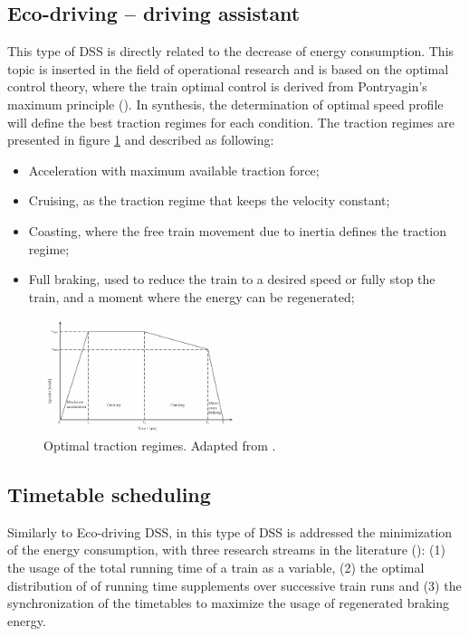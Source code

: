 \subsection{Eco-driving – driving assistant}
\label{subs:352}

	This type of \ac{DSS} is directly related to the decrease of energy consumption. This topic is inserted in the field of operational research and is based on the optimal control theory, where the train optimal control is derived from Pontryagin's maximum principle (\cite{pontryagin1963}).  
	In synthesis, the determination of optimal speed profile will define the best traction regimes for each condition. The traction regimes are presented in figure \ref{fig:scheepmaker2017a} and described as following:
	
	\begin{itemize}
		\setlength\itemsep{-0.5em}
		\item Acceleration with maximum available traction force;
		\item Cruising, as the traction regime that keeps the velocity constant;
		\item Coasting, where the free train movement due to inertia defines the traction regime;
		\item Full braking, used to reduce the train to a desired speed or fully stop the train, and a moment where the energy can be regenerated;
	\end{itemize}
	
	\begin{figure}[h!]
		\centering
		\includegraphics[width=0.5\textwidth,keepaspectratio]{figures/35.DSS/scheepmaker2017a}
		\caption{Optimal traction regimes. Adapted from \cite{scheepmaker2017}.}
		\label{fig:scheepmaker2017a}
	\end{figure}
	
	

\subsection{Timetable scheduling}
\label{subs:353}

	Similarly to Eco-driving \ac{DSS}, in this type of \ac{DSS} is addressed the minimization of the energy consumption, with three research streams in the literature (\cite{scheepmaker2017}): (1) the usage of the total running time of a train as a variable, (2) the optimal distribution of of running time supplements over successive train runs and (3) the synchronization of the timetables to maximize the usage of regenerated braking energy.
	
	
	
